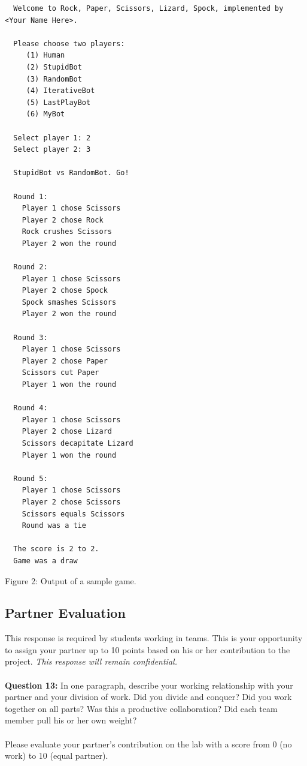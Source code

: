 \documentclass{article}
\begin{document}
\newpage

\begin{tcolorbox}
 \begin{verbatim}
  Welcome to Rock, Paper, Scissors, Lizard, Spock, implemented by <Your Name Here>.
  
  Please choose two players:
     (1) Human
     (2) StupidBot
     (3) RandomBot
     (4) IterativeBot
     (5) LastPlayBot
     (6) MyBot
  
  Select player 1: 2
  Select player 2: 3
  
  StupidBot vs RandomBot. Go!
  
  Round 1:
    Player 1 chose Scissors
    Player 2 chose Rock
    Rock crushes Scissors
    Player 2 won the round
    
  Round 2:
    Player 1 chose Scissors
    Player 2 chose Spock
    Spock smashes Scissors
    Player 2 won the round
    
  Round 3:
    Player 1 chose Scissors
    Player 2 chose Paper
    Scissors cut Paper
    Player 1 won the round
    
  Round 4:
    Player 1 chose Scissors
    Player 2 chose Lizard
    Scissors decapitate Lizard
    Player 1 won the round
    
  Round 5:
    Player 1 chose Scissors
    Player 2 chose Scissors
    Scissors equals Scissors
    Round was a tie
    
  The score is 2 to 2.
  Game was a draw
 \end{verbatim}
 
 \begin{center}
  Figure 2: Output of a sample game.
 \end{center}


\end{tcolorbox}


\newpage

\begin{tcolorbox}
 \section*{Partner Evaluation}
 This response is required by students working in teams. This is your opportunity to assign your partner up to 10 points based on his or her contribution to the project. \textit{This response will remain confidential.}
 \\\\
 \textbf{Question 13:} In one paragraph, describe your working relationship with your partner and your division of work. Did you divide and conquer? Did you work together on all parts? Was this a productive collaboration? Did each team member pull his or her own weight?
 \\\\
 Please evaluate your partner's contribution on the lab with a score from 0 (no work) to 10 (equal partner).
\end{tcolorbox}
\end{document}
